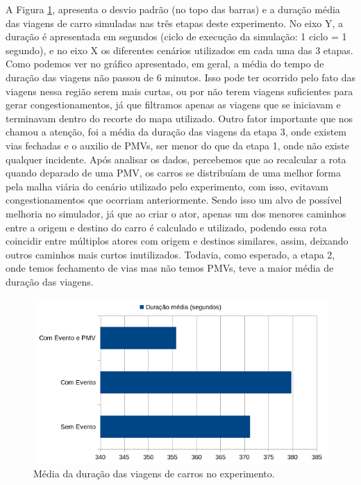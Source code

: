 A Figura \ref{fig:duracao_total}, apresenta o desvio padrão (no topo das barras) e a duração média das viagens de carro simuladas nas três etapas deste experimento.
No eixo Y, a duração é apresentada em segundos (ciclo de execução da simulação: 1 ciclo = 1 segundo), e no eixo X os diferentes cenários utilizados em cada uma das 3 etapas.
Como podemos ver no gráfico apresentado, em geral, a média do tempo de duração das viagens não passou de 6 minutos.
Isso pode ter ocorrido pelo fato das viagens nessa região serem mais curtas, ou por não terem viagens suficientes para gerar congestionamentos, já que filtramos apenas as viagens que se iniciavam e
terminavam dentro do recorte do mapa utilizado.
Outro fator importante que nos chamou a atenção, foi a média da duração das viagens da etapa 3, onde existem vias fechadas e o auxilio de PMVs, ser menor do que da etapa 1, onde não existe qualquer
incidente.
Após analisar os dados, percebemos que ao recalcular a rota quando deparado de uma PMV, os carros se distribuíam de uma melhor forma pela malha viária do cenário utilizado pelo experimento, com isso,
evitavam congestionamentos que ocorriam anteriormente.
Sendo isso um alvo de possível melhoria no simulador, já que ao criar o ator, apenas um dos menores caminhos entre a origem e destino do carro é calculado e utilizado, podendo essa rota coincidir entre
múltiplos atores com origem e destinos similares, assim, deixando outros caminhos mais curtos inutilizados.
Todavia, como esperado, a etapa 2, onde temos fechamento de vias mas não temos PMVs, teve a maior média de duração das viagens.

\begin{figure}[ht]
	\centering
	\includegraphics[width=\textwidth]{figuras/duracao_total.png}
	\caption{Média da duração das viagens de carros no experimento.}
	\label{fig:duracao_total}
\end{figure}

